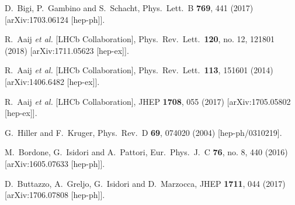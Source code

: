 \documentclass[aps,prd,superscriptaddress,twocolumn,secnumarabic]{revtex4-1}
\begin{document}
\begin{thebibliography}{99}
  D.~Bigi, P.~Gambino and S.~Schacht,
  Phys.\ Lett.\ B {\bf 769}, 441 (2017)
  [arXiv:1703.06124 [hep-ph]].


  R.~Aaij {\it et al.} [LHCb Collaboration],
  Phys.\ Rev.\ Lett.\  {\bf 120}, no. 12, 121801 (2018)
  [arXiv:1711.05623 [hep-ex]].


  R.~Aaij {\it et al.} [LHCb Collaboration],
  Phys.\ Rev.\ Lett.\  {\bf 113}, 151601 (2014)
  [arXiv:1406.6482 [hep-ex]].


  R.~Aaij {\it et al.} [LHCb Collaboration],
  JHEP {\bf 1708}, 055 (2017)
  [arXiv:1705.05802 [hep-ex]].


  G.~Hiller and F.~Kruger,
  Phys.\ Rev.\ D {\bf 69}, 074020 (2004)
  [hep-ph/0310219].


  M.~Bordone, G.~Isidori and A.~Pattori,
  Eur.\ Phys.\ J.\ C {\bf 76}, no. 8, 440 (2016)
  [arXiv:1605.07633 [hep-ph]].


  D.~Buttazzo, A.~Greljo, G.~Isidori and D.~Marzocca,
  JHEP {\bf 1711}, 044 (2017)
  [arXiv:1706.07808 [hep-ph]].



\end{thebibliography}
\end{document}
